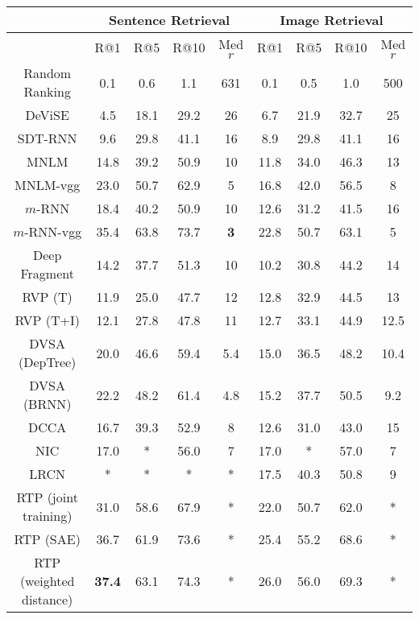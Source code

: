 \documentclass[10pt,twocolumn,letterpaper]{article}
\begin{document}
\begin{table*} \small
\begin{center}
\begin{tabular}{c|cccc|cccc}
    \hline
          & \multicolumn{4}{|c|}{Sentence Retrieval} & \multicolumn{4}{|c}{Image Retrieval}  \\
          \hline
          \hline
        & R@1 & R@5 & R@10 & Med $r$ & R@1 & R@5 & R@10 & Med $r$ \\
        \hline
        \hline
        Random Ranking & 0.1 & 0.6 & 1.1 & 631 & 0.1 & 0.5  & 1.0 & 500\\
DeViSE \cite{frome_nips2013}& 4.5 & 18.1 & 29.2 & 26 & 6.7 & 21.9  & 32.7 & 25\\
SDT-RNN \cite{socher_tacl2014}& 9.6 & 29.8 & 41.1 & 16 & 8.9 & 29.8  & 41.1 & 16\\
MNLM \cite{kiros_2014}& 14.8 & 39.2 & 50.9 & 10 & 11.8 & 34.0  & 46.3 & 13\\
MNLM-vgg \cite{kiros_2014}& 23.0 & 50.7 & 62.9 & 5 & 16.8 & 42.0  & 56.5 & 8\\
$m$-RNN \cite{mao_2014}& 18.4 & 40.2 & 50.9 & 10 & 12.6 & 31.2  & 41.5 & 16\\
$m$-RNN-vgg \cite{mao_iclr_2015}& {35.4} & {63.8} & {73.7} & \textbf{3} & {22.8} & {50.7}  & {63.1} & {5}\\
Deep Fragment  \cite{karpathy_2014}& 14.2 & 37.7 & 51.3 &10 & 10.2 & 30.8  & 44.2 & 14\\
RVP (T) \cite{chen_2014}& 11.9 & 25.0 & 47.7 & 12 & 12.8 & 32.9  & 44.5 & 13\\
RVP (T+I) \cite{chen_2014}& 12.1 & 27.8 & 47.8 & 11 & 12.7 & 33.1  & 44.9 & 12.5\\
DVSA (DepTree)  \cite{karpathy_dvsa_2014}& 20.0 & 46.6 & 59.4 & 5.4 & 15.0 & 36.5  & 48.2 & 10.4\\
DVSA (BRNN)  \cite{karpathy_dvsa_2014}& 22.2 & 48.2 & 61.4 & 4.8 & 15.2 & 37.7  & 50.5 & 9.2\\
DCCA \cite{yan_cvpr2015} & 16.7 & 39.3 & 52.9 & 8 & 12.6 & 31.0 & 43.0 & 15 \\
NIC \cite{vinyals_2014}& 17.0 & * & 56.0 & 7 & 17.0 & *  & 57.0 & 7\\
LRCN \cite{donahue_2014}& * & * & * & * & 17.5 & 40.3  & 50.8 & 9\\


        RTP (joint training) \cite{plummer_2015} & 31.0 & 58.6 & 67.9 & * & 22.0 & 50.7 & 62.0 & * \\
        RTP (SAE) \cite{plummer_2015} & 36.7 & 61.9 & 73.6 & * & 25.4 & 55.2 & 68.6 & *\\
        RTP (weighted distance) \cite{plummer_2015} & \textbf{37.4} & 63.1 & 74.3 & * & 26.0 & 56.0 & 69.3 & * \\


\end{tabular}
\end{center}
\end{table*}
\end{document}
